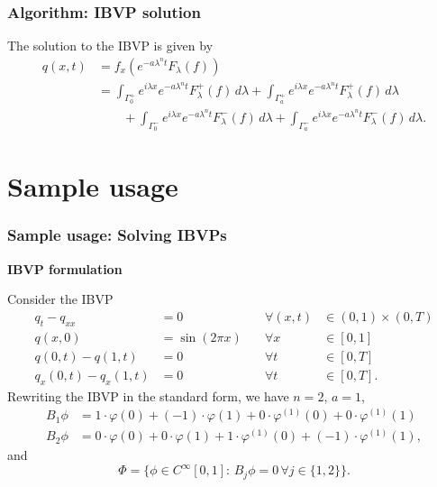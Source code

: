 \documentclass{beamer}
\begin{document}
\begin{frame}
    \frametitle{Algorithm: IBVP solution}
    The solution to the IBVP is given by 
    \begin{equation*}
        \begin{split}
            q(x,t) &= f_x\left(e^{-a\lambda^n t}F_\lambda(f)\right)\\
            &= \int_{\Gamma_0^+}e^{i\lambda x}e^{-a\lambda^n t}F_\lambda^+(f)\,d\lambda + \int_{\Gamma_a^+}e^{i\lambda x}e^{-a\lambda^n t}F_\lambda^+(f)\,d\lambda\\
            &\qquad + \int_{\Gamma_0^-}e^{i\lambda x}e^{-a\lambda^n t}F_\lambda^-(f)\,d\lambda + \int_{\Gamma_a^-}e^{i\lambda x}e^{-a\lambda^n t}F_\lambda^-(f)\,d\lambda.
        \end{split}
    \end{equation*}
\end{frame}

\section{Sample usage}
\begin{frame}
    \frametitle{Sample usage: Solving IBVPs}
    \textbf{IBVP formulation}

    Consider the IBVP
    \begin{subequations}\label{eq:ex1}
        \begin{alignat}{3}
            q_t - q_{xx} &= 0\quad &\forall (x,t)&\in (0,1)\times (0,T) \label{eq:ex1_PDE}\\
            q(x,0) &= \sin(2\pi x) \quad &\forall x&\in [0,1]\label{eq:ex1_initial_condition}\\
            q(0,t) - q(1,t) &= 0 &\forall t&\in [0,T]\label{eq:ex1_boundary_condition1}\\
            q_x(0,t) - q_x(1,t) &= 0 &\forall t&\in [0,T]\label{eq:ex1_boundary_condition2}.
        \end{alignat}
    \end{subequations}
    Rewriting the IBVP in the standard form, we have $n=2$, $a=1$,
    \begin{align*}
    B_1\phi &= 1\cdot \varphi(0) + (-1)\cdot \varphi(1) + 0\cdot \varphi^{(1)}(0) + 0\cdot \varphi^{(1)}(1)\\
    B_2\phi &= 0\cdot \varphi(0) + 0\cdot \varphi(1) + 1\cdot \varphi^{(1)}(0) + (-1)\cdot \varphi^{(1)}(1),
    \end{align*}
    and
    \[\Phi = \{\phi\in C^{\infty}[0,1]:\, B_j\phi = 0\,\forall j\in\{1,2\}\}.\]
\end{frame}
\end{document}
